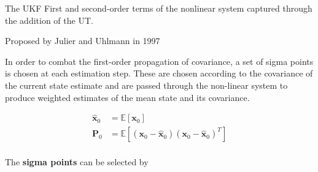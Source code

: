The \gls{UKF}
First and second-order terms of the nonlinear system captured through the
addition of the \gls{UT}.

Proposed by Julier and Uhlmann in 1997~\cite{Julier1997}

\cite{Wan2000, Wan2001}
In order to combat the first-order propagation of covariance, a set of sigma
points is chosen at each estimation step. These are chosen according to the
covariance of the current state estimate and are passed through the non-linear
system to produce weighted estimates of the mean state and its covariance.

\begin{equation}
    \begin{aligned}
        \hat{\bm{x}}_0 &= \mathbb{E}[\bm{x}_0]                                             \\
        \bm{P}_0       &= \mathbb{E}[(\bm{x}_0-\hat{\bm{x}}_0)(\bm{x}_0-\hat{\bm{x}}_0)^T] \\
    \end{aligned}
\end{equation}

\cite{Cheng2011}
The \textbf{sigma points} can be selected by

